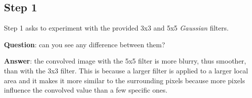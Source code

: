 \documentclass[lettersize,journal]{IEEEtran}
\begin{document}
\subsection{Step 1}\label{subsection:1:1}
\noindent Step 1 asks to experiment with the provided 3x3 and 5x5 \emph{Gaussian} filters.

\hbox{}

\noindent\textbf{Question}: can you see any difference between them?

\hbox{}

\noindent\textbf{Answer}:  the convolved image with the 5x5 filter is more blurry, thus smoother, than with the 3x3 filter. This is because a larger filter is applied to a larger local area and it makes it more similar to the surrounding pixels because more pixels influence the convolved value than a few specific ones.
\end{document}
